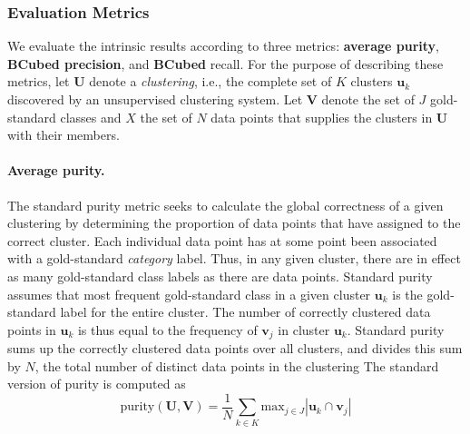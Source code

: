 {\subsubsection{Evaluation Metrics} 
\label{sec:metrics}
We evaluate the intrinsic results according to three metrics: \textbf{average purity}, \textbf{BCubed precision}, and
 \textbf{BCubed} recall. For the purpose of describing these metrics,
 let $\mathbf{U}$ denote a \emph{clustering}, i.e., the complete set of $K$ clusters $\mathbf{u}_k$
 discovered by an unsupervised clustering system. Let
 $\mathbf{V}$ denote the set of $J$ gold-standard classes and $X$ the set of $N$ data points 
 that supplies the clusters in $\mathbf{U}$ with their members. 

\paragraph{Average purity.}
The standard purity metric seeks to calculate the global correctness of a 
given clustering by determining the proportion of data points that have 
assigned to the correct cluster. Each individual data point has at some 
point been associated with a gold-standard \emph{category} label. Thus, 
in any given cluster, there are in effect as many gold-standard class 
labels as there are data points. Standard purity assumes that most frequent 
 gold-standard class in a given cluster $\mathbf{u}_k$ is the gold-standard label for the entire cluster. The number of correctly clustered data points in $\mathbf{u}_k$ is thus equal to the frequency of  $\mathbf{v}_j$ in cluster $\mathbf{u}_k$. Standard purity sums up the correctly clustered data points over all clusters, and divides this sum by $N$, the total number of distinct data points in the clustering
 The standard version of purity is computed as 
\begin{equation} \label{eq:pur1}
\text{purity}(\mathbf{U}, \mathbf{V}) = \frac{1}{N} \sum_{k \in K} \text{max}_{j \in J} |\mathbf{u}_k \cap \mathbf{v}_j|

\end{equation}}
